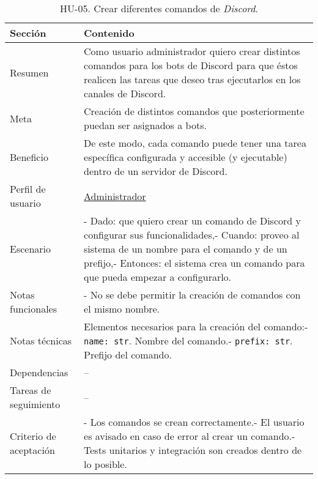 \begin{table}[H]
    \centering
    \def\arraystretch{1.25}
    \begin{adjustbox}{max width=\textwidth}
    \begin{tabularx}{\textwidth}{l|L}
    \hline
        \textbf{Sección} & \textbf{Contenido} \\ \hline
    \hline
        Resumen & Como usuario administrador quiero crear distintos comandos para los bots de Discord para que éstos realicen las tareas que deseo tras ejecutarlos en los canales de Discord. \\ \hline
        Meta & Creación de distintos comandos que posteriormente puedan ser asignados a bots. \\ \hline
        Beneficio & De este modo, cada comando puede tener una tarea específica configurada y accesible (y ejecutable) dentro de un servidor de Discord. \\ \hline
        Perfil de usuario & \hyperref[sec:personaAdmin]{Administrador} \\ \hline
        Escenario & - Dado: que quiero crear un comando de Discord y configurar sus funcionalidades,\linebreak - Cuando: proveo al sistema de un nombre para el comando y de un prefijo,\linebreak - Entonces: el sistema crea un comando para que pueda empezar a configurarlo. \\ \hline
        Notas funcionales & - No se debe permitir la creación de comandos con el mismo nombre. \\ \hline
        Notas técnicas & Elementos necesarios para la creación del comando:\linebreak - \verb|name: str|. Nombre del comando.\linebreak - \verb|prefix: str|. Prefijo del comando. \\ \hline
        Dependencias & – \\ \hline
        Tareas de seguimiento & – \\ \hline
        Criterio de aceptación & - Los comandos se crean correctamente.\linebreak - El usuario es avisado en caso de error al crear un comando.\linebreak - Tests unitarios y integración son creados dentro de lo posible. \\ \hline
    \end{tabularx}
    \end{adjustbox}
    \caption{HU-05. Crear diferentes comandos de \textit{Discord}.}
\end{table}

